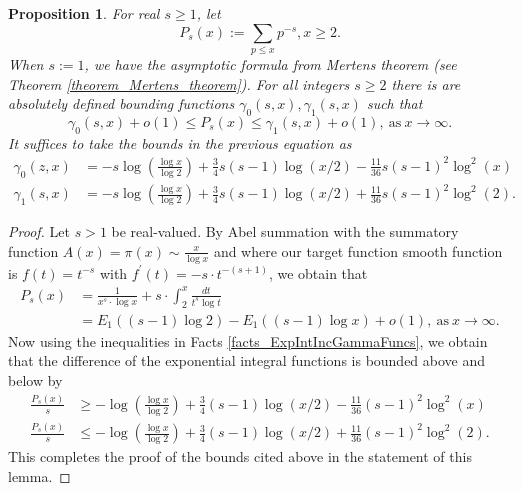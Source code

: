 \documentclass[11pt,reqno,a4letter]{article}
\numberwithin{figure}{section}
\numberwithin{table}{section}
\theoremstyle{plain}
\newtheorem{prop}[theorem]{Proposition}
\numberwithin{theorem}{section}
\theoremstyle{definition}
\newcommand{\NBRef}[1]{}
\begin{document}
\begin{prop} 
\label{cor_PartialSumsOfReciprocalsOfPrimePowers} 
For real $s \geq 1$, let 
\[
P_s(x) := \sum_{p \leq x} p^{-s}, x \geq 2. 
\]
When $s := 1$, we have the asymptotic formula from Mertens theorem 
(see Theorem \ref{theorem_Mertens_theorem}). 
For all integers $s \geq 2$ 
there is are absolutely defined bounding functions $\gamma_0(s, x),\gamma_1(s, x)$ such that 
\[
\gamma_0(s, x) + o(1) \leq P_s(x) \leq \gamma_1(s, x) + o(1), \mathrm{\ as\ } x \rightarrow \infty. 
\] 
It suffices to take the bounds in the previous equation as 
\begin{align*} 
\gamma_0(z, x) & = -s\log\left(\frac{\log x}{\log 2}\right) + \frac{3}{4}s(s-1) \log(x/2) - 
     \frac{11}{36} s(s-1)^2 \log^2(x) \\ 
\gamma_1(s, x) & = -s\log\left(\frac{\log x}{\log 2}\right) + \frac{3}{4}s(s-1) \log(x/2) + 
     \frac{11}{36} s(s-1)^2 \log^2(2). 
\end{align*}
\end{prop} 
\NBRef{A05-2020-04-26} 
\begin{proof} 
Let $s > 1$ be real-valued. 
By Abel summation with the summatory function $A(x) = \pi(x) \sim \frac{x}{\log x}$ and where 
our target function smooth function is $f(t) = t^{-s}$ with 
$f^{\prime}(t) = -s \cdot t^{-(s+1)}$, we obtain that 
\begin{align*} 
P_s(x) & = \frac{1}{x^s \cdot \log x} + s \cdot \int_2^{x} \frac{dt}{t^s \log t} \\ 
     & = E_1((s-1) \log 2) - E_1((s-1) \log x) + o(1), \mathrm{\ as\ } x \rightarrow \infty. 
\end{align*} 
Now using the inequalities in Facts \ref{facts_ExpIntIncGammaFuncs}, we obtain that the 
difference of the exponential integral functions is bounded above and below by 
\begin{align*} 
\frac{P_s(x)}{s} & \geq -\log\left(\frac{\log x}{\log 2}\right) + \frac{3}{4}(s-1) \log(x/2) - 
     \frac{11}{36} (s-1)^2 \log^2(x) \\ 
\frac{P_s(x)}{s} & \leq -\log\left(\frac{\log x}{\log 2}\right) + \frac{3}{4}(s-1) \log(x/2) + 
     \frac{11}{36} (s-1)^2 \log^2(2). 
\end{align*} 
This completes the proof of the bounds cited above in the statement of this lemma. 
\end{proof} 
\end{document}
